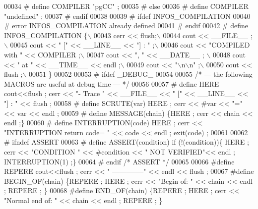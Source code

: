 \begin{DoxyCode}
00034 \textcolor{preprocessor}{# define COMPILER       "pgCC" ;}
00035 \textcolor{preprocessor}{# else}
00036 \textcolor{preprocessor}{# define COMPILER       "undefined" ;}
00037 \textcolor{preprocessor}{# endif}
00038 
00039 \textcolor{preprocessor}{# ifdef INFOS\_COMPILATION}
00040 \textcolor{preprocessor}{# error INFOS\_COMPILATION already defined}
00041 \textcolor{preprocessor}{# endif}
00042 \textcolor{preprocessor}{# define INFOS\_COMPILATION  \{\(\backslash\)}
00043 \textcolor{preprocessor}{                    cerr << flush;\(\backslash\)}
00044 \textcolor{preprocessor}{                    cout << \_\_FILE\_\_ ;\(\backslash\)}
00045 \textcolor{preprocessor}{                    cout << " [" << \_\_LINE\_\_ << "] : " ;\(\backslash\)}
00046 \textcolor{preprocessor}{                    cout << "COMPILED with " << COMPILER ;\(\backslash\)}
00047 \textcolor{preprocessor}{                    cout << ", " << \_\_DATE\_\_ ; \(\backslash\)}
00048 \textcolor{preprocessor}{                    cout << " at " << \_\_TIME\_\_ << endl ;\(\backslash\)}
00049 \textcolor{preprocessor}{                    cout << "\(\backslash\)n\(\backslash\)n" ;\(\backslash\)}
00050 \textcolor{preprocessor}{                    cout << flush ;\(\backslash\)}
00051 \textcolor{preprocessor}{                \}}
00052 
00053 \textcolor{preprocessor}{# ifdef \_DEBUG\_}
00054 
00055 \textcolor{comment}{/* --- the following MACROS are useful at debug time --- */}
00056 
00057 \textcolor{preprocessor}{# define HERE cout<<flush ; cerr << "- Trace " << \_\_FILE\_\_ << " [" << \_\_LINE\_\_ << "] : " << flush ;}
00058 \textcolor{preprocessor}{# define SCRUTE(var) HERE ; cerr << #var << "=" << var << endl ;}
00059 \textcolor{preprocessor}{# define MESSAGE(chain) \{HERE ; cerr << chain << endl ;\}}
00060 \textcolor{preprocessor}{# define INTERRUPTION(code) HERE ; cerr << "INTERRUPTION return code= " << code << endl ; exit(code) ;}
00061 
00062 \textcolor{preprocessor}{# ifndef ASSERT}
00063 \textcolor{preprocessor}{# define ASSERT(condition) if (!(condition))\{ HERE ; cerr << "CONDITION " << #condition << " NOT
       VERIFIED"<< endl ; INTERRUPTION(1) ;\}}
00064 \textcolor{preprocessor}{# endif }\textcolor{comment}{/* ASSERT */}\textcolor{preprocessor}{}
00065 
00066 \textcolor{preprocessor}{#define REPERE cout<<flush ; cerr << "   --------------" << endl << flush ;}
00067 \textcolor{preprocessor}{#define BEGIN\_OF(chain) \{REPERE ; HERE ; cerr << "Begin of: " << chain << endl ; REPERE ; \}}
00068 \textcolor{preprocessor}{#define END\_OF(chain) \{REPERE ; HERE ; cerr << "Normal end of: " << chain << endl ; REPERE ; \}}

\end{DoxyCode}
